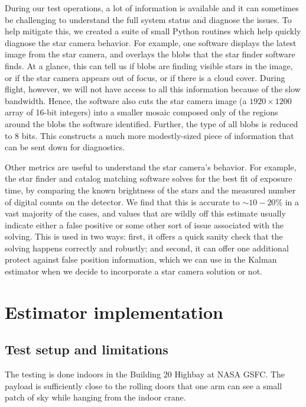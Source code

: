 During our test operations, a lot of information is available and  it can sometimes be challenging to understand the full system status and diagnose the issues. To help mitigate this, we created a suite of small Python routines which help quickly diagnose the star camera behavior. For example, one software displays the latest image from the star camera, and overlays the blobs that the star finder software finds. At a glance, this can tell us if blobs are finding visible stars in the image, or if the star camera appears out of focus, or if there is a cloud cover. During flight, however, we will not have access to all this information because of the slow bandwidth. Hence, the software also cuts the star camera image (a $1920\times 1200$ array of 16-bit integers) into a smaller mosaic composed only of the regions around the blobs the software identified. Further, the type of all blobs is reduced to 8 bits. This constructs a much more modestly-sized piece of information that can be sent down for diagnostics.

Other metrics are useful to understand the star camera's behavior. For example, the star finder and catalog matching software solves for the best fit of exposure time, by comparing the known brightness of the stars and the measured number of digital counts on the detector. We find that this is accurate to $\sim 10-20\%$ in a vast majority of the cases, and values that are wildly off this estimate usually indicate either a false positive or some other sort of issue associated with the solving. This is used in two ways: first, it offers a quick sanity check that the solving happens correctly and robustly; and second, it can offer one additional protect against false position information, which we can use in the Kalman estimator when we decide to incorporate a star camera solution or not.


\section{Estimator implementation}

\subsection{Test setup and limitations}

The testing is done indoors in the Building 20 Highbay at NASA GSFC. The payload is sufficiently close to the rolling doors that one arm can see a small patch of sky while hanging from the indoor crane.


